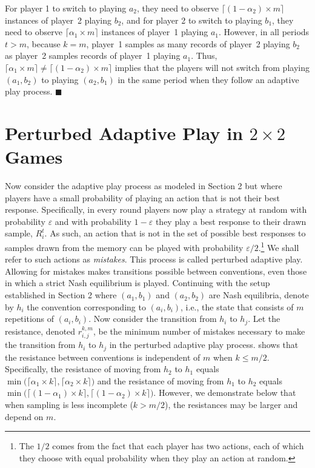 For player 1 to switch to playing $a_2$, they need to observe $\lceil (1-\alpha_2)\times m\rceil$ instances of player~2 playing $b_2$, and for player 2 to switch to playing $b_1$, they need to observe $\lceil \alpha_1\times m\rceil$ instances of player~1 playing $a_1$.
%
However, in all periods $t>m$, because $k=m$, player~1 samples as many records of player~2 playing $b_2$ as player~2 samples records of player~1 playing $a_1$. 
Thus, $\lceil \alpha_1\times m\rceil \neq\lceil (1-\alpha_2)\times m\rceil$ implies that the players will not switch from playing $(a_1,b_2)$ to playing $(a_2,b_1)$ in the same period when they follow an adaptive play process.    
%
$\blacksquare$

\section{Perturbed Adaptive Play in $2 \times 2$ Games}

Now consider the adaptive play process as modeled in Section 2 but where players have a small probability of playing an action that is not their best response. Specifically, in every round players now play a strategy at random with probability $\varepsilon$ and with probability $1-\varepsilon$ they play a best response to their drawn sample, $R_i^{t}$. As such, an action that is not in the set of possible best responses to samples drawn from the memory can be played with probability $\varepsilon/2$.\footnote{The $1/2$ comes from the fact that each player has two actions, each of which they choose with equal probability when they
play an action at random.} We shall refer to such actions as \textit{mistakes}. This process is called perturbed adaptive play. Allowing for mistakes makes transitions possible between conventions, even those in which a strict Nash equilibrium is played. Continuing with the setup established in Section 2 where $(a_1, b_1)$ and $(a_2, b_2)$ are Nash equilibria, denote by $h_i$ the convention corresponding to $(a_i, b_i)$, i.e., the state that consists of $m$
repetitions of $(a_i, b_i)$.
Now consider the transition from $h_i$ to $h_j$. Let the resistance, denoted $r_{i,j}^{k,m}$, be the minimum number of mistakes necessary to make the transition from $h_i$ to $h_j$ in the perturbed adaptive play process.
\cite{Young1998} shows that the resistance between conventions is independent of $m$ when $k \leq m/2$. Specifically, the resistance of moving from $h_2$ to $h_1$ equals $\min\big(\lceil \alpha_1 \times k \rceil,\lceil \alpha_2 \times k \rceil\big)$ and the resistance of moving from $h_1$ to $h_2$ equals $\min\big(\lceil (1-\alpha_1) \times k \rceil,\lceil (1-\alpha_2) \times  k \rceil\big)$. However, we demonstrate below that when sampling is less incomplete ($k > m/2$), the resistances may be larger and depend on $m$.


